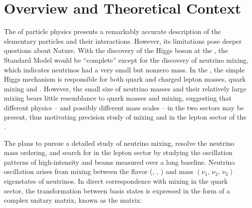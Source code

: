 \section{Overview and Theoretical Context}

\label{sec:physics-lbnosc-context}

The  of particle physics presents a remarkably accurate
description of the elementary particles and their
interactions. However, its limitations pose deeper questions about
Nature. With the discovery of the Higgs boson at the , the Standard
Model would be ``complete'' except for the discovery of neutrino
mixing, which indicates neutrinos had a very small but nonzero
mass. In the , %
the simple Higgs mechanism is responsible
for both quark and charged lepton masses, quark mixing and
. %
However, the small size of neutrino
masses and their relatively large mixing bears little resemblance to
quark masses and mixing, suggesting that different physics -- and
possibly different mass scales -- in the two sectors may be present,
thus motivating precision study of mixing and  %
in the
lepton sector of the . 


The  plans to pursue a detailed study of neutrino mixing, resolve the
neutrino mass ordering, and search for  %
in the lepton
sector by studying the oscillation patterns of
high-intensity \numu and \anumu %
beams measured over a long baseline.  Neutrino oscillation arises from
mixing between the flavor 
(\nue, \numu, \nutau) and mass $(\nu_1,\, \nu_2,\, \nu_3)$ eigenstates
of neutrinos.  
In direct correspondence with mixing in the quark sector, the transformation
between basis states is expressed in the form of a complex unitary
matrix, known as the  matrix: %

